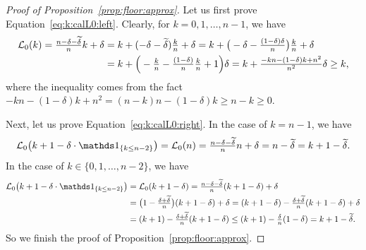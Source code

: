 \documentclass[nohyperref]{article}
\theoremstyle{plain}
\theoremstyle{definition}
\theoremstyle{remark}
\begin{document}
\begin{proof}[Proof of Proposition~\ref{prop:floor:approx}]
Let us first prove Equation~\eqref{eq:k:calL0:left}. Clearly, for $k=0,1,\dotsc,n-1$, we have
\begin{equation*}
	\begin{split}
		{\mathcal{L}}_0(k)=\tfrac{n-\delta-{\widetilde{\delta}}}{n}k+\delta
		&=k+(-\delta-{\widetilde{\delta}})\tfrac{k}{n}+\delta
		=k+ \big(-\delta-\tfrac{(1-\delta)\delta}{n}\big)\tfrac{k}{n}+\delta	\\
		&=k  + \Big(- \tfrac{k}{n}-\tfrac{(1-\delta)}{n}\tfrac{k}{n}+1\Big)\delta	
    =k  + \tfrac{-kn-(1-\delta)k+n^2}{n^2}\delta\ge k,
	\end{split}
\end{equation*}
where the inequality comes from the fact $-kn-(1-\delta)k+n^2=(n-k)n-(1-\delta)k\ge n-k\ge 0$.


Next, let us  prove Equation~\eqref{eq:k:calL0:right}. 
In the case of $k=n-1$, we have
\begin{equation*}
	\calL_0\big(k+1-\delta\cdot\one_{\{k\le n-2\}}\big)=\calL_0(n)=\tfrac{n-\delta-\tildedelta}{n}n+\delta=n-\tildedelta=k+1-\tildedelta.
\end{equation*}
In the case of $k\in \{0,1,\dotsc,n-2\}$, we have 
\begin{equation*}
	\begin{split}
		\calL_0\big(k+1-\delta\cdot\one_{\{k\le n-2\}}\big)
		&=\calL_0(k+1-\delta)
		=\tfrac{n-\delta-\tildedelta}{n}(k+1-\delta)+\delta\\
		&=\big(1-\tfrac{\delta+\tildedelta}{n}\big)(k+1-\delta)+\delta
  =(k+1-\delta)-\tfrac{\delta+\tildedelta}{n}(k+1-\delta) +\delta\\
		&= (k+1)-\tfrac{\delta+\tildedelta}{n}(k+1-\delta)\le (k+1) -\tfrac{\delta}{n}(1-\delta)= k+1-\tildedelta.
	\end{split}
\end{equation*}
So we finish the proof of Proposition~\ref{prop:floor:approx}.
\end{proof}
\end{document}
